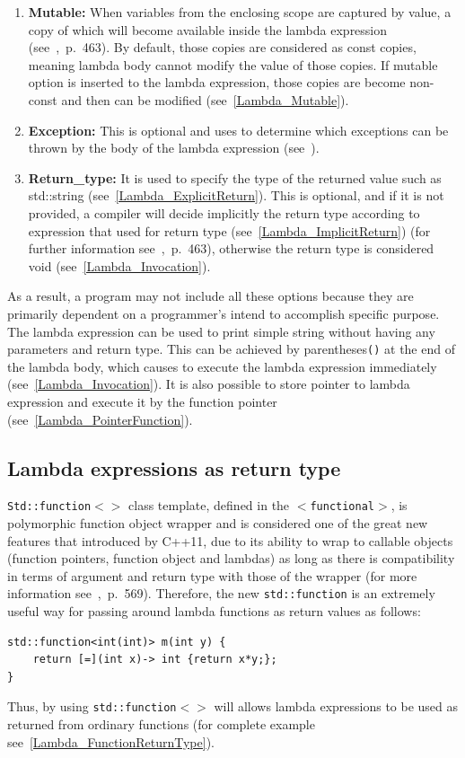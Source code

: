\documentclass[11pt]{report}
\begin{document}
\begin{enumerate}
\item \textbf{Mutable:} When variables from the enclosing scope are captured by value, a copy of which will become available inside the lambda expression (see~\cite{Cppreference:2012:Cpp11},~p.~463). By default, those copies are considered as const copies, meaning lambda body cannot modify the value of those copies. If mutable option is inserted to the lambda expression, those copies are become non-const and then can be modified (see~\ref{Lambda_Mutable}).

\item \textbf{Exception:} This is optional and uses to determine which exceptions can be thrown by the body of the lambda expression (see~\cite{Gregorie:professionalcpp}).

\item \textbf{Return\_type:} It is used to specify the type of the returned value such as std::string (see~\ref{Lambda_ExplicitReturn}). This is optional, and if it is not provided, a compiler will decide implicitly the return type according to expression that used for return type (see~\ref{Lambda_ImplicitReturn}) (for further information see~\cite{Cppreference:2012:Cpp11},~p.~463), otherwise the return type is considered void (see~\ref{Lambda_Invocation}).
\end{enumerate}

As a result, a program may not include all these options because they are primarily dependent on a programmer's intend to accomplish specific purpose. The lambda expression can be used to print simple string without having any parameters and return type. This can be achieved by parentheses\texttt{()} at the end of the lambda body, which causes to execute the lambda expression immediately (see~\ref{Lambda_Invocation}). It is also possible to store pointer to lambda expression and execute it by the function pointer (see~\ref{Lambda_PointerFunction}).

\subsection{Lambda expressions as return type}
\label{subsection: Lambda Expressions as Return Type}
\texttt{Std::function$<>$} class template, defined in the \texttt{$<$functional$>$}, is polymorphic function object wrapper and is considered one of the great new features that introduced by C++11, due to its ability to wrap to callable objects (function pointers, function object and lambdas) as long as there is compatibility in terms of argument and return type with those of the wrapper (for more information see~\cite{Gregorie:professionalcpp},~p.~569). Therefore, the new \texttt{std::function} is an extremely useful way for passing around lambda functions as return values as follows:
\begin{lstlisting}
std::function<int(int)> m(int y) {
    return [=](int x)-> int {return x*y;};
}
\end{lstlisting}
Thus, by using \texttt{std::function$<>$} will allows lambda expressions to be used as returned from ordinary functions (for complete example see~\ref{Lambda_FunctionReturnType}).
\end{document}

